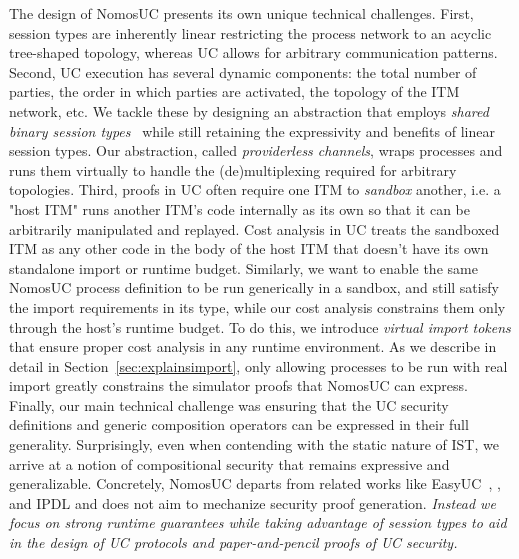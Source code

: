 The design of NomosUC presents its own unique technical challenges.  First,
session types are inherently linear restricting the process network to an
acyclic tree-shaped topology, whereas UC allows for arbitrary communication
patterns.  Second, UC execution has several dynamic components: the total
number of parties, the order in which parties are activated, the topology of
the ITM network, etc.  We tackle these by designing an abstraction that employs
\emph{shared binary session types}~\cite{balzer2017manifest} while still
retaining the expressivity and benefits of linear session types.  Our
abstraction, called \emph{providerless channels}, wraps processes and runs them
virtually to handle the (de)multiplexing required for arbitrary topologies.
Third, proofs in UC often require one ITM to \emph{sandbox} another, i.e. a
"host ITM" runs another ITM's code internally as its own so that it can be
arbitrarily manipulated and replayed.  Cost analysis in UC treats the sandboxed
ITM as any other code in the body of the host ITM that doesn't have its own
standalone import or runtime budget.  Similarly, we want to enable the same
NomosUC process definition to be run generically in a sandbox, and still
satisfy the import requirements in its type, while our cost analysis constrains
them only through the host's runtime budget.  To do this, we introduce
\emph{virtual import tokens} that ensure proper cost analysis in any runtime
environment.  As we describe in detail in Section~\ref{sec:explainsimport},
only allowing processes to be run with real import greatly constrains the
simulator proofs that NomosUC can express.
Finally, our main technical challenge was ensuring that the UC security
definitions and generic composition operators can be expressed in their full
generality.  Surprisingly, even when contending with the static nature of IST, we
arrive at a notion of compositional security that remains expressive and
generalizable.  Concretely, NomosUC departs from related works like
EasyUC~\cite{easyuc}, \cite{barbosa}, and IPDL\cite{ipdl} and does not aim to
mechanize security proof generation.  \emph{Instead we focus on strong runtime
guarantees while taking advantage of session types to aid in the design of UC
protocols and paper-and-pencil proofs of UC security.}

